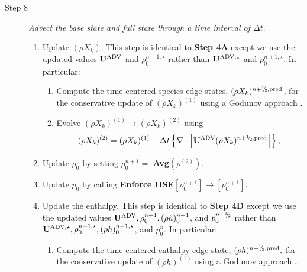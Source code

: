 \documentclass{aastex62}
\newcommand{\sfrac}[2]{\mathchoice
  {\kern0em\raise.5ex\hbox{\the\scriptfont0 #1}\kern-.15em/
   \kern-.15em\lower.25ex\hbox{\the\scriptfont0 #2}}
  {\kern0em\raise.5ex\hbox{\the\scriptfont0 #1}\kern-.15em/
   \kern-.15em\lower.25ex\hbox{\the\scriptfont0 #2}}
  {\kern0em\raise.5ex\hbox{\the\scriptscriptfont0 #1}\kern-.2em/
   \kern-.15em\lower.25ex\hbox{\the\scriptscriptfont0 #2}}
  {#1\!/#2}}
\newcommand{\myhalf}{\sfrac{1}{2}}
\newcommand{\Ub}{{\bf{U}}}
\newcommand{\dt}{\Delta t}
\newcommand{\pred}{{\rm pred}}
\newcommand{\nph}{{n+\myhalf}}
\newcommand{\uadvone}{\Ub^{\mathrm{ADV},\star}}
\newcommand{\uadvtwo}{\Ub^{\mathrm{ADV}}}
\begin{document}
\begin{description}
\item[Step 8] {\em Advect the base state and full state through a time interval of $\dt.$}

\begin{enumerate}
\renewcommand{\theenumi}{{\bf \Alph{enumi}}}

\item Update $(\rho X_k)$.  This step is identical to {\bf Step 4A} except we use
  the updated values $\uadvtwo$ and $\rho_0^{n+1,\star}$ rather than
  $\uadvone$ and $\rho_0^{n+1,\star}$.  In particular:

\begin{enumerate}
\renewcommand{\labelenumii}{{\bf \roman{enumii}}.}

\item Compute the time-centered species edge states, $(\rho X_k)^{\nph,\pred}$,
  for the conservative update of $(\rho X_k)^{(1)}$ using a Godunov approach \citep{XRB_III}.

\item Evolve $(\rho X_k)^{(1)} \rightarrow (\rho X_k)^{(2)}$ using
\begin{equation}
(\rho X_k)^{(2)} = (\rho X_k)^{(1)}
- \dt \left\{ \nabla \cdot \left[\uadvtwo (\rho X_k)^{\nph,\pred} \right] \right\},
\end{equation}

\end{enumerate}

\item Update $\rho_0$ by setting $\rho_0^{n+1} =$ {\bf Avg}$(\rho^{(2)})$.

\item Update $p_0$ by calling
{\bf Enforce HSE}$[\rho_0^{n+1}] \rightarrow [p_0^{n+1}]$.

\item Update the enthalpy.  This step is identical to {\bf Step 4D} except we use
  the updated values $\uadvtwo, \rho_0^{n+1}, (\rho h)_0^{n+1}$, and $p_0^{n+\myhalf}$
  rather than
  $\uadvone, \rho_0^{n+1,\star}, (\rho h)_0^{n+1,\star}$, and $p_0^n$.
  In particular:

\begin{enumerate}
\renewcommand{\labelenumii}{{\bf \roman{enumii}}.}

\item Compute the time-centered enthalpy edge state, $(\rho h)^{\nph,\pred},$
  for the conservative update of $(\rho h)^{(1)}$ using a Godunov approach \citep{XRB_III}..


\end{enumerate}
\end{enumerate}
\end{description}
\end{document}
